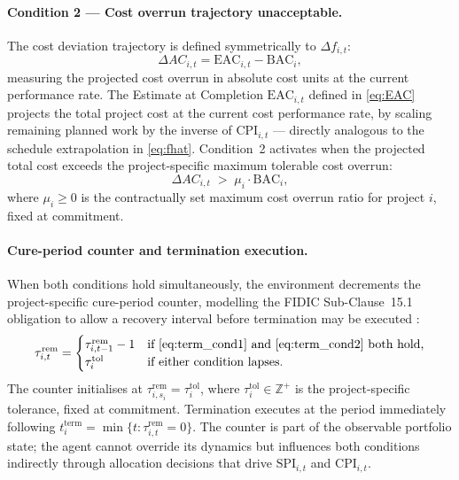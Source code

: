 \paragraph{Condition 2 --- Cost overrun trajectory unacceptable.}
The cost deviation trajectory is defined symmetrically to $\Delta f_{i,t}$:
\begin{equation}
  \Delta AC_{i,t} = \mathrm{EAC}_{i,t} - \mathrm{BAC}_i,
  \label{eq:delta_ac}
\end{equation}
measuring the projected cost overrun in absolute cost units at the current
performance rate. The Estimate at Completion $\mathrm{EAC}_{i,t}$ defined
in \eqref{eq:EAC} projects the total project cost at the current cost
performance rate, by scaling remaining planned work by the inverse of
$\mathrm{CPI}_{i,t}$ --- directly analogous to the schedule extrapolation
in \eqref{eq:fhat}. Condition~2 activates when the projected total cost
exceeds the project-specific maximum tolerable cost overrun:
\begin{equation}
  \Delta AC_{i,t} \;>\; \mu_i \cdot \mathrm{BAC}_i,
  \label{eq:term_cond2}
\end{equation}
where $\mu_i \geq 0$ is the contractually set maximum cost overrun ratio
for project $i$, fixed at commitment.

\paragraph{Cure-period counter and termination execution.}
When both conditions hold simultaneously, the environment decrements the
project-specific cure-period counter, modelling the FIDIC
Sub-Clause~15.1 obligation to allow a recovery interval before
termination may be executed \citep{FIDIC2017, Ndekugri2008}:
\begin{equation}
  \tau_{i,t}^{\mathrm{rem}}
    = \begin{cases}
        \tau_{i,t-1}^{\mathrm{rem}} - 1
          & \text{if \eqref{eq:term_cond1} and \eqref{eq:term_cond2}
                  both hold,} \\
        \tau_i^{\mathrm{tol}}
          & \text{if either condition lapses.}
      \end{cases}
  \label{eq:counter}
\end{equation}
The counter initialises at
$\tau_{i,s_i}^{\mathrm{rem}} = \tau_i^{\mathrm{tol}}$, where
$\tau_i^{\mathrm{tol}} \in \mathbb{Z}^+$ is the project-specific
tolerance, fixed at commitment. Termination executes at the period
immediately following
$t_i^{\mathrm{term}} = \min\{t : \tau_{i,t}^{\mathrm{rem}} = 0\}$.
The counter is part of the observable portfolio state; the agent cannot
override its dynamics but influences both conditions indirectly through
allocation decisions that drive $\mathrm{SPI}_{i,t}$ and
$\mathrm{CPI}_{i,t}$.

